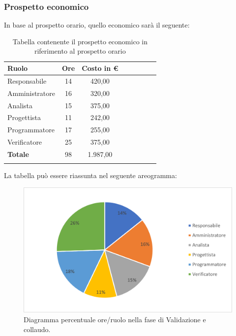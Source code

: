 			\subsubsection{Prospetto economico}
			In base al prospetto orario, quello economico sarà il seguente: 
			
			\begin{longtable}{|l|c|c|c|c|c|c|c|}
				\hline
				\rowcolor{lighter-grayer}
				\textbf{Ruolo} & \textbf{Ore} & \textbf{Costo in €} \\
				\hline
				\endfirsthead
				
				\hline
				Responsabile & 14 & 420,00\\
				\hline
				\hline
				Amministratore & 16 & 320,00\\
				\hline
				\hline
				Analista & 15 & 375,00\\
				\hline
				\hline
				Progettista & 11 & 242,00\\
				\hline
				\hline
				Programmatore & 17 & 255,00\\
				\hline
				\hline
				Verificatore & 25 & 375,00\\
				\hline
				\hline
				\textbf{Totale} & 98 & 1.987,00\\
				\hline
				\rowcolor{white}
				\caption{Tabella contenente il prospetto economico in riferimento al prospetto orario}
			\end{longtable}
			\pagebreak
		
			La tabella può essere riassunta nel seguente areogramma:
			\begin{figure}[H]
				\centering
				\includegraphics[width=0.8\linewidth]{res/images/preventivo/7-2.png}
				\caption{Diagramma percentuale ore/ruolo nella fase di Validazione e collaudo.}
				\label{fig:diagramma costi ruolo fase Validazione e collaudo.}
            \end{figure}
			
